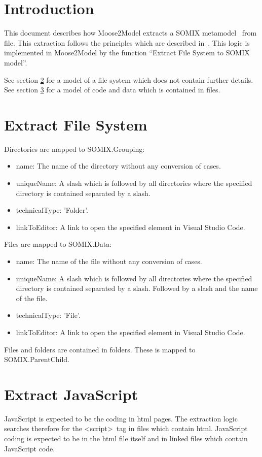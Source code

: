 \documentclass[preprint,12pt]{elsarticle}
\begin{document}

\section{Introduction}
\label{intro}
This document describes how Moose2Model extracts a SOMIX metamodel~\cite{r_SOMIX} from file. 
This extraction follows the principles which are described in~\cite{r_Metamodel_Preprint_2}. 
This logic is implemented in Moose2Model by the function ``Extract File System to SOMIX model''.

See section \ref{ExFile} for a model of a file system which does not contain further details.
See section \ref{CodeFile} for a model of code and data which is contained in files.

\section{Extract File System}
\label{ExFile}
Directories are mapped to SOMIX.Grouping: 

\begin{itemize}
\item name: The name of the directory without any conversion of cases.
\item uniqueName: A slash which is followed by all directories where the specified directory is contained separated by a slash.
\item technicalType: 'Folder'.
\item linkToEditor: A link to open the specified element in Visual Studio Code.
\end{itemize}

Files are mapped to SOMIX.Data:
\begin{itemize}
\item name: The name of the file without any conversion of cases.
\item uniqueName: A slash which is followed by all  directories where the specified directory is contained separated by a slash. Followed by a slash and the name of the file.
\item technicalType: 'File'.
\item linkToEditor: A link to open the specified element in Visual Studio Code.
\end{itemize}

Files and folders are contained in folders. These is mapped to SOMIX.ParentChild.

\section{Extract JavaScript}
\label{CodeFile}
JavaScript is expected to be the coding in html pages. The extraction logic searches therefore for the \textless script\textgreater~tag in files which contain html. JavaScript coding is expected to be in the html file itself and in linked files which contain JavaScript code.
\end{document}
